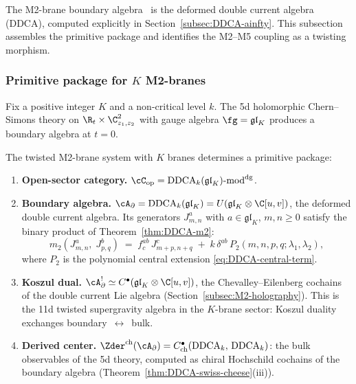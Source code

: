 The M2-brane boundary algebra~\cite{Costello-1705.02500v1}
is the deformed double current algebra (DDCA), computed
explicitly in Section~\ref{subsec:DDCA-ainfty}. This
subsection assembles the primitive package and
identifies the M2--M5 coupling as a twisting morphism.

\subsubsection{Primitive package for $K$ M2-branes}

Fix a positive integer $K$ and a non-critical level $k$.
The 5d holomorphic Chern--Simons theory on
$\R_t \times \C^2_{z_1,z_2}$ with gauge algebra
$\fg = \mathfrak{gl}_K$ produces a boundary algebra at $t = 0$.

\begin{theorem}
\label{thm:twisted-M2-primitive-package}
The twisted M2-brane system with $K$ branes determines a
primitive package:
\begin{enumerate}[label=\textup{(\roman*)},nosep]
\item \textbf{Open-sector category.}
 $\cC_{\mathrm{op}} = \mathrm{DDCA}_{k}(\mathfrak{gl}_K)\text{-}\mathrm{mod}^{\mathrm{dg}}$.

\item \textbf{Boundary algebra.}
 $\cA_\partial = \mathrm{DDCA}_k(\mathfrak{gl}_K)
 = U(\mathfrak{gl}_K \otimes \C[u,v])$,
 the deformed double current algebra. Its generators
 $J^a_{m,n}$ with $a \in \mathfrak{gl}_K$, $m,n \ge 0$
 satisfy the binary product of Theorem~\ref{thm:DDCA-m2}:
 \[
 m_2(J^a_{m,n},\; J^b_{p,q})
 \;=\;
 f^{ab}_c\, J^c_{m+p,n+q}
 \;+\;
 k\,\delta^{ab}\,
 P_2(m,n,p,q;\lambda_1,\lambda_2),
 \]
 where $P_2$ is the polynomial central extension
 \eqref{eq:DDCA-central-term}.

\item \textbf{Koszul dual.}
 $\cA_\partial^!
 \simeq C^\bullet(\mathfrak{gl}_K \otimes \C[u,v])$,
 the Chevalley--Eilenberg cochains of the double current
 Lie algebra \textup{(}Section~\ref{subsec:M2-holography}\textup{)}.
 This is the 11d twisted supergravity algebra in the
 $K$-brane sector: Koszul duality exchanges
 boundary~$\leftrightarrow$~bulk.

\item \textbf{Derived center.}
 $\Zder^{\mathrm{ch}}(\cA_\partial)
 = C^\bullet_{\mathrm{ch}}(\mathrm{DDCA}_k,\, \mathrm{DDCA}_k)$:
 the bulk observables of the 5d theory, computed as chiral
 Hochschild cochains of the boundary algebra
 \textup{(}Theorem~\ref{thm:DDCA-swiss-cheese}(iii)\textup{)}.


\end{enumerate}
\end{theorem}
